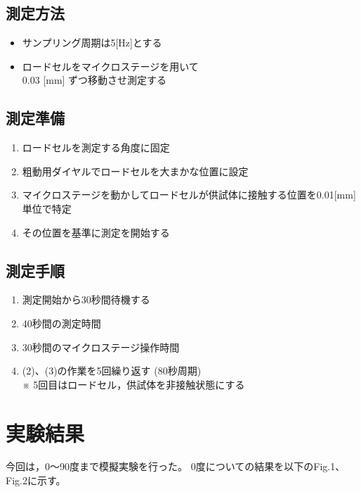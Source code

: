 \documentclass[twocolumn,a4j]{jsarticle}
\begin{document}
\subsection{測定方法}
\begin{itemize}
    \item サンプリング周期は5[Hz]とする
    \item ロードセルをマイクロステージを用いて\\0.03 [mm] ずつ移動させ測定する
\end{itemize}

\subsection{測定準備}
\begin{screen}
    \begin{enumerate}[(1)]
        \item ロードセルを測定する角度に固定
        \item 粗動用ダイヤルでロードセルを大まかな位置に設定
        \item マイクロステージを動かしてロードセルが供試体に接触する位置を0.01[mm]単位で特定
        \item その位置を基準に測定を開始する
    \end{enumerate}
\end{screen}

\subsection{測定手順}
\begin{screen}
    \begin{enumerate}[(1)]
        \item 測定開始から30秒間待機する
        \item 40秒間の測定時間
        \item 30秒間のマイクロステージ操作時間
        \item (2)、(3)の作業を5回繰り返す (80秒周期)\\
              ※ 5回目はロードセル，供試体を非接触状態にする
    \end{enumerate}
\end{screen}

\section{実験結果}
今回は，0～90度まで模擬実験を行った。
0度についての結果を以下のFig.1、Fig.2に示す。
\end{document}
